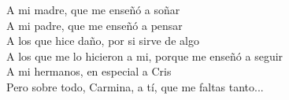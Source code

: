 

\renewcommand{\contentsname}{Índice General}
\renewcommand{\listtablename}{Lista de Tablas}
\renewcommand{\tablename}{Tabla}

\newpage
\begin{flushright}
	\phantom{blank}
	\vspace{25mm}

	A mi madre, que me enseñó a soñar \\
	A mi padre, que me enseñó a pensar  \\
	A los que hice daño, por si sirve de algo  \\
	A los que me lo hicieron a mi, porque me enseñó a seguir  \\
	A mi hermanos, en especial a Cris  \\
	Pero sobre todo, Carmina, a tí, que me faltas tanto...  \\
\end{flushright}

\tableofcontents
\newpage
\cleardoublepage
\listoffigures %
\cleardoublepage
\listoftables %
\thispagestyle{empty}

\newpage	